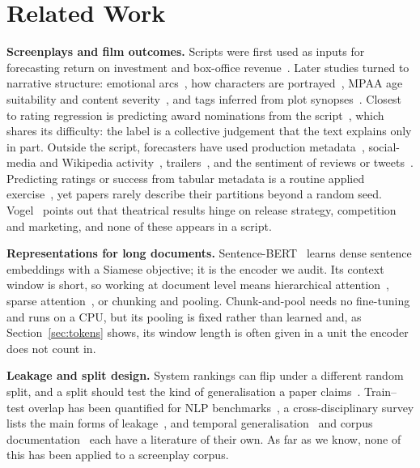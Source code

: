\documentclass[conference,a4paper]{IEEEtran}
\newcommand{\hlt}[1]{\textbf{#1}}
\begin{document}
\section{Related Work}

\hlt{Screenplays and film outcomes.} Scripts were first used as inputs
for forecasting return on investment and box-office
revenue~\cite{eliashberg2014,hunter2016}. Later studies turned to
narrative structure: emotional arcs~\cite{reagan2016,chu2017}, how
characters are portrayed~\cite{ramakrishna2017}, MPAA age suitability and
content severity~\cite{shafaei2020,mohamed2020,zhang2021}, and tags
inferred from plot synopses~\cite{kar2018}. Closest to rating regression
is predicting award nominations from the script~\cite{chiu2020}, which
shares its difficulty: the label is a collective judgement that the text
explains only in part. Outside the script, forecasters have used
production metadata~\cite{sharda2006}, social-media and Wikipedia
activity~\cite{asur2010,oghina2012,mishne2006,mestyan2013},
trailers~\cite{madongo2024}, and the sentiment of reviews or
tweets~\cite{naeem2022,tripathi2023}. Predicting ratings or success from
tabular metadata is a routine applied
exercise~\cite{lee2018,bristi2019,gomes2022,udandarao2024,xie2025}, yet
papers rarely describe their partitions beyond a random seed. Vogel~\cite{vogel2020} points out that theatrical results hinge on
release strategy, competition and marketing, and none of these appears
in a script.

\hlt{Representations for long documents.} Sentence-BERT~\cite{reimers2019}
learns dense sentence embeddings with a Siamese objective; it is the
encoder we audit. Its context window is short, so working at document
level means hierarchical attention~\cite{chalkidis2022}, sparse
attention~\cite{beltagy2020}, or chunking and pooling. Chunk-and-pool
needs no fine-tuning and runs on a CPU, but its pooling is fixed rather
than learned and, as Section~\ref{sec:tokens} shows, its window length is
often given in a unit the encoder does not count in.

\hlt{Leakage and split design.} System rankings can flip under a
different random split, and a split should test the kind of
generalisation a paper claims~\cite{gorman2019,sogaard2021}. Train--test
overlap has been quantified for NLP
benchmarks~\cite{lewis2021,elangovan2021}, a cross-disciplinary survey
lists the main forms of leakage~\cite{kapoor2023}, and temporal
generalisation~\cite{lazaridou2021} and corpus
documentation~\cite{bender2018,dodge2021} each have a literature of their
own. As far as we know, none of this has been applied to a screenplay
corpus.
\end{document}
